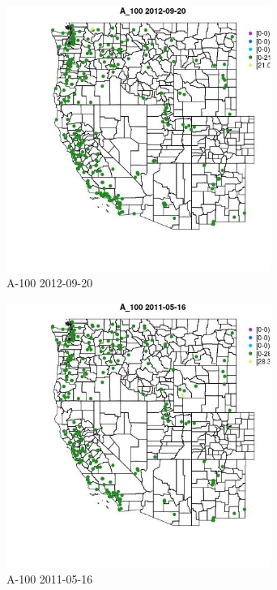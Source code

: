 \begin{figure} 
\centering  
\includegraphics[width=0.77\textwidth]{Code_Outputs/ML_input_report_ML_input_PM25_Step5_part_d_de_duplicated_aves_ML_input_MapObsA_1002012-09-20.jpg} 
\caption{\label{fig:ML_input_report_ML_input_PM25_Step5_part_d_de_duplicated_aves_ML_inputMapObsA_1002012-09-20}A-100 2012-09-20} 
\end{figure} 
 

\clearpage 

\begin{figure} 
\centering  
\includegraphics[width=0.77\textwidth]{Code_Outputs/ML_input_report_ML_input_PM25_Step5_part_d_de_duplicated_aves_ML_input_MapObsA_1002011-05-16.jpg} 
\caption{\label{fig:ML_input_report_ML_input_PM25_Step5_part_d_de_duplicated_aves_ML_inputMapObsA_1002011-05-16}A-100 2011-05-16} 
\end{figure} 
 

